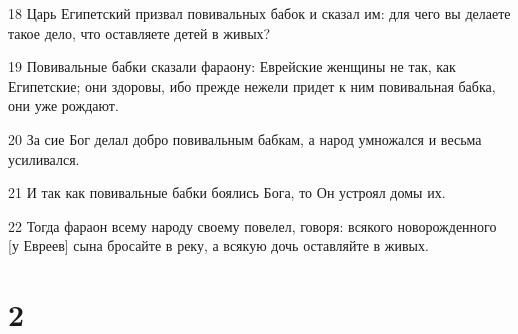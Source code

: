 \par 18 Царь Египетский призвал повивальных бабок и сказал им: для чего вы делаете такое дело, что оставляете детей в живых?
\par 19 Повивальные бабки сказали фараону: Еврейские женщины не так, как Египетские; они здоровы, ибо прежде нежели придет к ним повивальная бабка, они уже рождают.
\par 20 За сие Бог делал добро повивальным бабкам, а народ умножался и весьма усиливался.
\par 21 И так как повивальные бабки боялись Бога, то Он устроял домы их.
\par 22 Тогда фараон всему народу своему повелел, говоря: всякого новорожденного [у Евреев] сына бросайте в реку, а всякую дочь оставляйте в живых.

\chapter{2}


